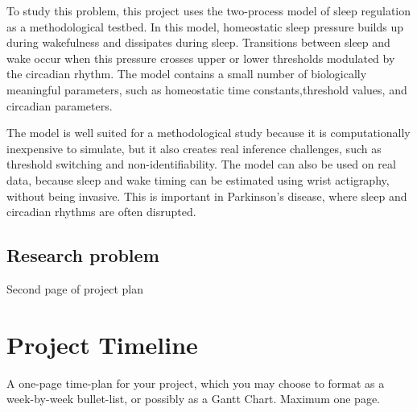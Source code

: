\documentclass{article}
\begin{document}
To study this problem, this project uses the two-process model of sleep regulation as a methodological testbed. In this model, homeostatic sleep pressure builds up during wakefulness and dissipates during sleep. Transitions between sleep and wake occur when this pressure crosses upper or lower thresholds modulated by the circadian rhythm. The model contains a small number of biologically meaningful parameters, such as homeostatic time constants,threshold values, and circadian parameters. 

The model is well suited for a methodological study because it is computationally inexpensive to simulate, but it also creates real inference challenges, such as threshold switching and non-identifiability. The model can also be used on real data, because sleep and wake timing can be estimated using wrist actigraphy, without being invasive. This is important in Parkinson's disease, where sleep and circadian rhythms are often disrupted.

\subsection{Research problem}


\newpage

Second page of project plan

\newpage



\newpage

\appendix
\section{Project Timeline}

A one-page time-plan for your project, which you may choose to format as a week-by-week bullet-list, or possibly as a Gantt Chart. Maximum one page.
\end{document}

